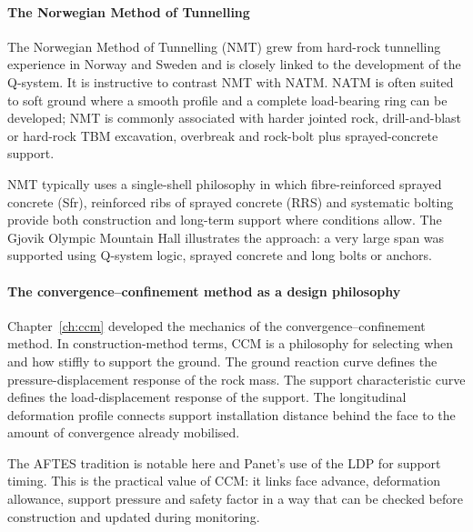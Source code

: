 \paragraph{The Norwegian Method of Tunnelling}
\label{sec:nmt}
The Norwegian Method of Tunnelling (NMT) grew from hard-rock tunnelling experience in Norway and Sweden and is closely linked to the development of the Q-system. It is instructive to contrast NMT with NATM. NATM is often suited to soft ground where a smooth profile and a complete load-bearing ring can be developed; NMT is commonly associated with harder jointed rock, drill-and-blast or hard-rock TBM excavation, overbreak and rock-bolt plus sprayed-concrete support.

NMT typically uses a single-shell philosophy in which fibre-reinforced sprayed concrete (Sfr), reinforced ribs of sprayed concrete (RRS) and systematic bolting provide both construction and long-term support where conditions allow. The Gjovik Olympic Mountain Hall illustrates the approach: a very large span was supported using Q-system logic, sprayed concrete and long bolts or anchors.

\paragraph{The convergence--confinement method as a design philosophy}
\label{sec:ccm-as-philosophy}
Chapter~\ref{ch:ccm} developed the mechanics of the convergence--confinement method. In construction-method terms, CCM is a philosophy for selecting when and how stiffly to support the ground. The ground reaction curve defines the pressure-displacement response of the rock mass. The support characteristic curve defines the load-displacement response of the support. The longitudinal deformation profile connects support installation distance behind the face to the amount of convergence already mobilised.

The AFTES tradition is notable here and Panet's use of the LDP for support timing. This is the practical value of CCM: it links face advance, deformation allowance, support pressure and safety factor in a way that can be checked before construction and updated during monitoring.

